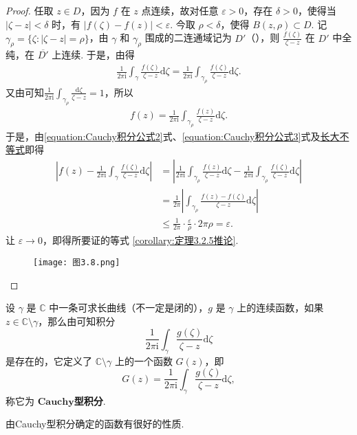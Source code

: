 \documentclass[../../main.tex]{subfiles}
\begin{document}
\begin{proof}
任取 \( z \in D \)，因为 \( f \) 在 \( z \) 点连续，故对任意 \( \varepsilon > 0 \)，存在 \( \delta > 0 \)，使得当 \( |\zeta - z| < \delta \) 时，有 \( |f(\zeta) - f(z)| < \varepsilon \). 今取 \( \rho < \delta \)，使得 \( B(z, \rho) \subset D \). 记 \( \gamma_{\rho} = \{\zeta: |\zeta - z| = \rho\} \)，由 \( \gamma \) 和 \( \gamma_{\rho} \) 围成的二连通域记为 \( D' \)（），则 \( \frac{f(\zeta)}{\zeta - z} \) 在 \( D' \) 中全纯，在 \( \overline{D'} \) 上连续. 于是，由得
\begin{align}\label{equation:Cauchy积分公式2}
\frac{1}{2\pi \mathrm{i}} \int_{\gamma} \frac{f(\zeta)}{\zeta - z} \mathrm{d}\zeta = \frac{1}{2\pi \mathrm{i}} \int_{\gamma_{\rho}} \frac{f(\zeta)}{\zeta - z} \mathrm{d}\zeta.
\end{align}
又由可知\( \frac{1}{2\pi \mathrm{i}} \int_{\gamma_{\rho}} \frac{\mathrm{d}\zeta}{\zeta - z} = 1 \)，所以
\begin{align}
f(z) = \frac{1}{2\pi \mathrm{i}} \int_{\gamma_{\rho}} \frac{f(z)}{\zeta - z} \mathrm{d}\zeta. \label{equation:Cauchy积分公式3}
\end{align}
于是，由\eqref{equation:Cauchy积分公式2}式、\eqref{equation:Cauchy积分公式3}式及\hyperref[proposition:长大不等式]{长大不等式}即得
\begin{align*}
\left| f(z) - \frac{1}{2\pi \mathrm{i}} \int_{\gamma} \frac{f(\zeta)}{\zeta - z} \mathrm{d}\zeta \right| 
&= \left| \frac{1}{2\pi \mathrm{i}} \int_{\gamma_{\rho}} \frac{f(z)}{\zeta - z} \mathrm{d}\zeta - \frac{1}{2\pi \mathrm{i}} \int_{\gamma_{\rho}} \frac{f(\zeta)}{\zeta - z} \mathrm{d}\zeta \right| \\
&= \frac{1}{2\pi} \left| \int_{\gamma_{\rho}} \frac{f(z) - f(\zeta)}{\zeta - z} \mathrm{d}\zeta \right| \\
& \leqslant \frac{1}{2\pi} \cdot \frac{\varepsilon}{\rho} \cdot 2\pi \rho = \varepsilon.
\end{align*}
让 \( \varepsilon \to 0 \)，即得所要证的等式 \eqref{corollary:定理3.2.5推论}. 
\begin{figure}[H]
\centering
\texttt{[image: 图3.8.png]}
\caption{}
\label{figure:图3.8}
\end{figure}

\end{proof}

\begin{definition}
设 \( \gamma \) 是 \( \mathbb{C} \) 中一条可求长曲线（不一定是闭的），\( g \) 是 \( \gamma \) 上的连续函数，如果 \( z \in \mathbb{C} \setminus \gamma \)，那么由可知积分
\[
\frac{1}{2\pi \mathrm{i}} \int_{\gamma} \frac{g(\zeta)}{\zeta - z} \mathrm{d}\zeta
\]
是存在的，它定义了 \( \mathbb{C} \setminus \gamma \) 上的一个函数 \( G(z) \)，即
\[
G(z) = \frac{1}{2\pi \mathrm{i}} \int_{\gamma} \frac{g(\zeta)}{\zeta - z} \mathrm{d}\zeta,
\]
称它为 $\mathbf{Cauchy}$\textbf{型积分}. 
\end{definition}
\begin{note}
由Cauchy型积分确定的函数有很好的性质. 
\end{note}
\end{document}
